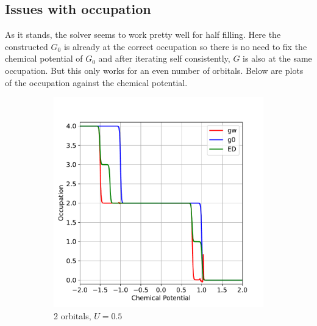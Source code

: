 \documentclass[12pt]{article}
\begin{document}
\subsection*{Issues with occupation}
As it stands, the solver seems to work pretty well for half filling. Here the constructed $G_0$ is already at the correct occupation so there is no need to fix the chemical potential of $G_0$ and after iterating self consistently, $G$ is also at the same occupation. But this only works for an even number of orbitals. Below are plots of the occupation against the chemical potential.
\begin{figure}[h!]
  \centering
  \begin{subfigure}[b]{0.45\textwidth}
    \includegraphics[width=\textwidth]{o2.pdf}
    \caption{2 orbitals, $U=0.5$}
  \end{subfigure}
  \hspace{0.02\textwidth}
  \begin{subfigure}[b]{0.45\textwidth}

\end{subfigure}
\end{figure}
\end{document}
